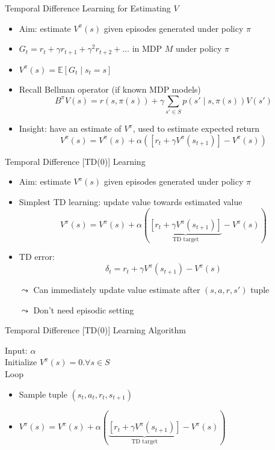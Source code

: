 \documentclass[aspectratio=169]{../latex_main/tntbeamer}  %
\begin{document}
\begin{frame}[c]{Temporal Difference Learning for Estimating $V$}

\begin{itemize}
	\item Aim: estimate $V^\pi(s)$ given episodes generated under policy $\pi$
	\item $G_t = r_t + \gamma r_{t+1} + \gamma^2 r_{t+2} + \ldots$  in MDP $M$ under policy $\pi$
	\item $V^\pi(s) = \mathbb{E}[G_t \mid s_t = s]$
	\smallskip
	\pause
	\item Recall Bellman operator (if known MDP models)
	$$B^\pi V(s) = r(s,\pi(s)) + \gamma \sum_{s'\in S} p(s'\mid s, \pi(s)) V(s')$$
	\pause
	\item Insight: have an estimate of $V^\pi$, used to estimate expected return
	$$ V^\pi(s) = V^\pi(s) + \alpha ([r_t + \gamma V^\pi (s_{t+1})] - V^\pi(s))$$
\end{itemize}


\end{frame}
\begin{frame}[c]{Temporal Difference [TD(0)] Learning}
	
	\begin{itemize}
		\item Aim: estimate $V^\pi(s)$ given episodes generated under policy $\pi$
		\item Simplest TD learning: update value towards estimated value
		$$ V^\pi(s) = V^\pi(s) + \alpha (\underbrace{[r_t + \gamma V^\pi (s_{t+1})]}_{\text{TD target}} - V^\pi(s))$$
		\pause
		\item TD error:
		$$ \delta_t = r_t + \gamma V^\pi(s_{t+1}) - V^\pi (s) $$
		\pause
		\item[$\leadsto$] Can immediately update value estimate after $(s,a,r,s')$ tuple
		\item[$\leadsto$] Don’t need episodic setting
	\end{itemize}
	
\end{frame}
\begin{frame}[c]{Temporal Difference [TD(0)] Learning Algorithm}
	
	Input: $\alpha$\\
	Initialize $V^\pi(s) = 0. \forall s \in S$\\
	Loop\\
	\begin{itemize}
		\item Sample tuple $(s_t, a_t, r_t, s_{t+1})$
		\item $V^\pi(s) = V^\pi(s) + \alpha (\underbrace{[r_t + \gamma V^\pi (s_{t+1})]}_{\text{TD target}} - V^\pi(s))$
	\end{itemize}
	
\end{frame}
\end{document}

